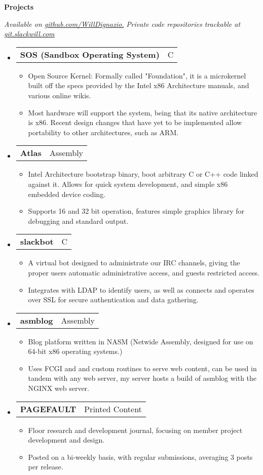 \documentclass[letterpaper,11pt]{article}
\makeatletter
\newcommand{\resheading}[1]{{\large \colorbox{mygrey}{\begin{minipage}{\textwidth}{\textbf{#1 \vphantom{p\^{E}}}}\end{minipage}}}}
\newcommand{\restwosubheading}[2]{
\begin{tabular*}{6.5in}{l@{\extracolsep{\fill}}r}
		\textbf{#1} & #2 \\
\end{tabular*}\vspace{-6pt}}
\makeatother
\begin{document}
\resheading{Projects}
{ \footnotesize
	\textit{Available on {\href{http://www.github.com/WillDignazio/}{github.com/WillDignazio.}}}
	\textit{Private code repositories trackable at {\href{http://git.slackwill.com/}{git.slackwill.com}}}
	\begin{itemize}
		\item 
		\restwosubheading{SOS (Sandbox Operating System) }{C}
			\begin{itemize}
				\item{Open Source Kernel: Formally called "Foundation", it is a microkernel built off the specs provided by the Intel x86 Architecture manuals, and various online wikis.}
				\item{Most hardware will support the system, being that its native architecture is x86. Recent design changes that have yet to be implemented allow portability to other architectures, such as ARM.}
			\end{itemize}
		\item		
		\restwosubheading{Atlas}{Assembly}
			\begin{itemize}
				\item{Intel Architecture bootstrap binary, boot arbitrary C or C++ code linked against it. Allows for quick system development, and simple x86 embedded device coding.} 
				\item{Supports 16 and 32 bit operation, features simple graphics library for debugging and standard output.}
			\end{itemize}
		\item
		\restwosubheading{slackbot}{C}
			\begin{itemize}
				\item{A virtual bot designed to administrate our IRC channels, giving the proper users automatic administrative access, and guests restricted access.}
				\item{Integrates with LDAP to identify users, as well as connects and operates over SSL for secure authentication and data gathering.}
			\end{itemize}
		\item		
		\restwosubheading{asmblog}{Assembly}
			\begin{itemize}
				\item{Blog platform written in NASM (Netwide Assembly, designed for use on 64-bit x86 operating systems.)}
				\item{Uses FCGI and and custom routines to serve web content, can be used in tandem with any web server, my server hosts a build of asmblog with the NGINX web server.}
			\end{itemize}
		\item
		\restwosubheading{PAGEFAULT}{Printed Content}
			\begin{itemize}
				\item{Floor research and development journal, focusing on member project development and design.}
				\item{Posted on a bi-weekly basis, with regular submissions, averaging 3 posts per release.}
			\end{itemize}
	\end{itemize}
}

\end{document}
